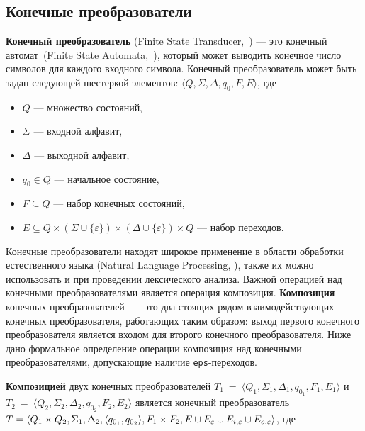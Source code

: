 \subsection{Конечные преобразователи}

\textbf{Конечный преобразователь} (Finite State Transducer,~\cite{FST}) {---} это конечный автомат~(Finite State Automata,~\cite{FSA}), который может выводить конечное число символов для каждого входного символа. Конечный преобразователь может быть задан следующей шестеркой элементов: $\langle Q, \Sigma, \Delta, q_0, F, E \rangle$, где

\begin{itemize}
\item $Q$ --- множество состояний, 
\item $\Sigma$ --- входной алфавит, 
\item $\Delta$ --- выходной алфавит, 
\item $q_0 \in Q$ --- начальное состояние, 
\item $F \subseteq Q$ --- набор конечных состояний, 
\item $E \subseteq Q \times (\Sigma \cup \{\varepsilon\}) \times (\Delta \cup \{\varepsilon\})  \times Q$ --- набор переходов. 
\end{itemize}

Конечные преобразователи находят широкое применение в области обработки естественного языка (Natural Language Processing, \cite{Mohri}), также их можно использовать и при проведении лексического анализа. Важной операцией над конечными преобразователями является операция композиция. \textbf{Композиция} конечных преобразователей~{---}~это два стоящих рядом  взаимодействующих конечных преобразователя, работающих таким образом: выход первого конечного преобразователя является входом для второго конечного преобразователя. Ниже дано формальное определение операции композиция над конечными преобразователями, допускающие наличие \verb|eps|-переходов.

\textbf{Композицией} двух конечных преобразователей $T_1~=~\langle Q_1, \Sigma_1, \Delta_1, q_{0_{1}}, F_1, E_1 \rangle$ и $T_2~=~\langle Q_2, \Sigma_2, \Delta_2, q_{0_{2}}, F_2, E_2 \rangle$ является конечный преобразователь  $T =\langle Q_1  \times Q_2, \Sigma_1, \Delta_2, \\ \langle q_{0_{1}}, q_{0_{2}} \rangle, F_1 \times F_2, E \cup E_{\varepsilon} \cup E_{i,\varepsilon} \cup E_{o,\varepsilon} \rangle$, где 

